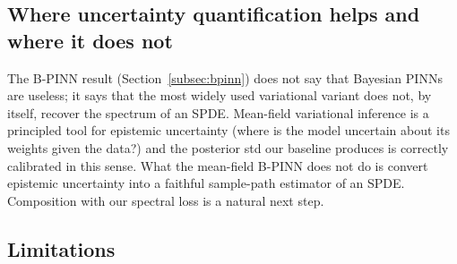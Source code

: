 \documentclass[review,12pt]{elsarticle}
\begin{document}
\subsection{Where uncertainty quantification helps and where it does not}

The B-PINN result (Section~\ref{subsec:bpinn}) does not say that
Bayesian PINNs are useless; it says that the most widely used
variational variant does not, by itself, recover the spectrum of
an SPDE. Mean-field variational inference is a principled tool for
epistemic uncertainty (where is the model uncertain about its
weights given the data?) and the posterior std our baseline
produces is correctly calibrated in this sense. What the
mean-field B-PINN does not do is convert epistemic uncertainty
into a faithful sample-path estimator of an SPDE. Composition with
our spectral loss is a natural next step.

\subsection{Limitations}
\end{document}
